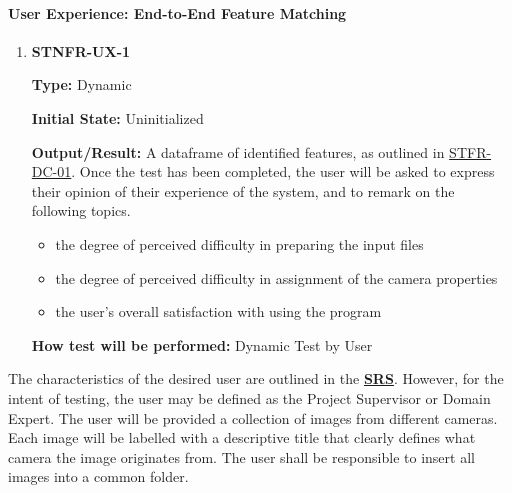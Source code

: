 \documentclass[12pt, titlepage]{article}
\begin{document}
\paragraph{User Experience: End-to-End Feature Matching}
\begin{enumerate}
\item \hypertarget{STNFR-UX-1}{\textbf{STNFR-UX-1}\\}
\textbf{Type:} Dynamic

\textbf{Initial State:} Uninitialized

\textbf{Output/Result:} A dataframe of identified features, as outlined in \hyperlink{STFR-DC-01}{STFR-DC-01}. 
Once the test has been completed, the user will be asked to express their opinion of their experience of the 
system, and to remark on the following topics.
\begin{itemize}
\item the degree of perceived difficulty in preparing the input files
\item the degree of perceived difficulty in assignment of the camera properties
\item the user's overall satisfaction with using the program
\end{itemize} 

\textbf{How test will be performed:} Dynamic Test by User
\end{enumerate}
The characteristics of the desired user are outlined in the \textbf{\href{https://github.com/KiranSingh15/CAS-741-Image-Correspondences/blob/main/docs/SRS/SRS.pdf}{SRS}}. However, for the intent of testing, the user may be defined as the Project Supervisor or Domain Expert. The user will be provided a collection of images from different cameras. Each image will be labelled with 
a descriptive title that clearly defines what camera the image originates from. The user shall be responsible 
to insert all images into a common folder.
\end{document}
